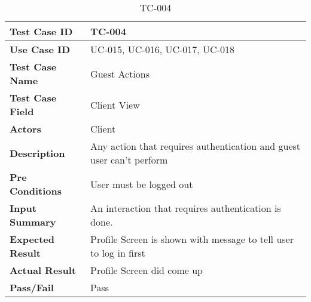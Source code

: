 

\begin{table}[h]
    \centering
    \caption{TC-004}
    \begin{tabular}{ |p{3.8cm}|p{8cm}| }
        \hline
        \textbf{Test Case ID}    & TC-004                                                               \\
        \hline
        \textbf{Use Case ID}     & UC-015, UC-016, UC-017, UC-018                                       \\
        \hline
        \textbf{Test Case Name}  & Guest Actions                                                        \\
        \hline
        \textbf{Test Case Field} & Client View                                                          \\
        \hline
        \textbf{Actors}          & Client                                                               \\
        \hline
        \textbf{Description}     & Any action that requires authentication and guest user can't perform \\
        \hline
        \textbf{Pre Conditions}  & User must be logged out                                              \\
        \hline
        \textbf{Input Summary}   & An interaction that requires authentication is done.                 \\
        \hline
        \textbf{Expected Result} & Profile Screen is shown with message to tell user to log in first    \\
        \hline
        \textbf{Actual Result}   & Profile Screen did come up                                           \\
        \hline
        \textbf{Pass/Fail}       & Pass                                                                 \\
        \hline
    \end{tabular}
\end{table}